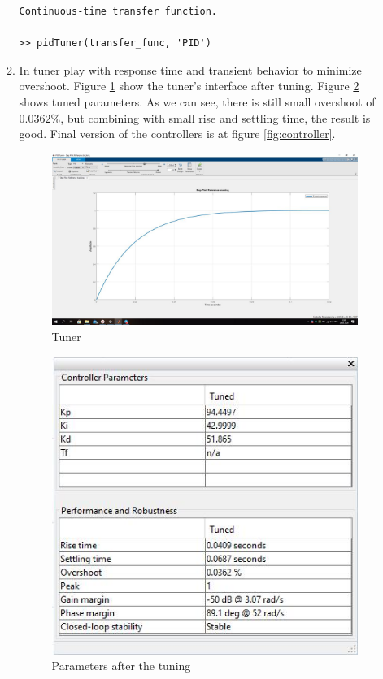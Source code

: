 \documentclass[12pt,letterpaper]{article}
\begin{document}
\begin{enumerate}[leftmargin=!,labelindent=5pt]
\begin{enumerate}
\begin{verbatim}
Continuous-time transfer function.

>> pidTuner(transfer_func, 'PID')
            \end{verbatim}
            
            \item In tuner play with response time and transient behavior to minimize overshoot. Figure \ref{fig:tuner} show the tuner's interface after tuning. Figure \ref{fig:tuned_params} shows tuned parameters. As we can see, there is still small overshoot of $0.0362\%$, but combining with small rise and settling time, the result is good. Final version of the controllers is at figure \ref{fig:controller}.
            \begin{figure}[H]
                \centering
                \includegraphics[width=15cm]{images/steps/tuner.jpg}
                \caption{Tuner}
                \label{fig:tuner}
            \end{figure} 
            
            \begin{figure}[H]
                \centering
                \includegraphics{images/steps/params.jpg}
                \caption{Parameters after the tuning}
                \label{fig:tuned_params}
            \end{figure} 
            

\end{enumerate}
\end{enumerate}
\end{document}
